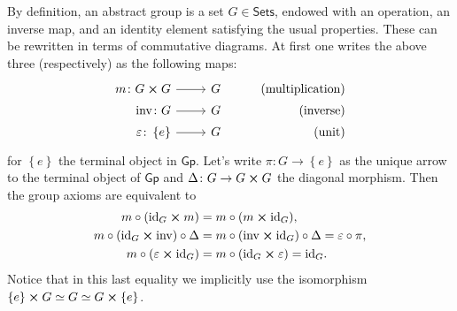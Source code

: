 \documentclass[../Main]{subfiles}
\begin{document}
\begin{rem}[]
	By definition, an abstract group is a set $G \in \mathsf{Sets}$, endowed with an operation,
	an inverse map, and an identity element satisfying the usual properties.
	These can be rewritten in terms of commutative diagrams.
	At first one writes the above three (respectively) as the following maps:
	\begin{equation*}
			\begin{tikzcd}[row sep = 0ex
         ,/tikz/column 1/.append style={anchor=base east}
         ,/tikz/column 2/.append style={anchor=base west}
         ,/tikz/column 3/.append style={anchor=base east}]
			m\colon G \cross G \arrow[r, "", rightarrow] &
			G & \text{(multiplication)} \\
			\mathrm{inv}\colon G \arrow[r, "", rightarrow] &
			G & \text{(inverse)} \\
			\varepsilon \colon \left\{ e \right\} \arrow[r, "", rightarrow] &
			G & \text{(unit)} 
		\end{tikzcd}
	\end{equation*} 
	for $\left\{ e \right\}$ the terminal object in $\mathsf{Gp}$.
	Let's write $\pi\colon G \to \left\{ e \right\}$
	as the unique arrow to the terminal object of $\mathsf{Gp}$
	and $\Delta\colon G \to G \cross G$ the diagonal morphism.
	Then the group axioms are equivalent to
	\begin{align}\label{eq:GroupAxioms}
		m \circ (\mathrm{id}_{ G } \cross m) &= m \circ (m \cross \mathrm{id}_{ G }),\nonumber\\
		m \circ (\mathrm{id}_{ G } \cross \mathrm{inv}) \circ \Delta &=
		m \circ (\mathrm{inv} \cross \mathrm{id}_{ G }) \circ \Delta = \varepsilon \circ \pi,\\
		m \circ (\varepsilon \cross \mathrm{id}_{ G }) &=
		m \circ (\mathrm{id}_{ G } \cross \varepsilon) = \mathrm{id}_{ G }\nonumber
	.\end{align} 
	Notice that in this last equality we implicitly use the isomorphism
	$\left\{ e \right\} \cross G \simeq G \simeq G \cross \left\{ e \right\}$.
\end{rem}
\end{document}
